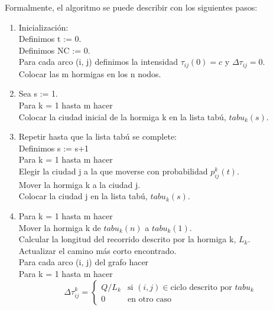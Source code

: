\documentclass{article}
\begin{document}
Formalmente, el algoritmo se puede describir con los siguientes pasos:
\begin{enumerate}
    \item Inicialización: \\
    \hspace*{0.25cm} Definimos t := 0. \\
    \hspace*{0.25cm} Definimos NC := 0. \\
    \hspace*{0.25cm} Para cada arco (i, j) definimos la intensidad $\tau_{ij}(0) = c$ y $\Delta \tau_{ij} = 0$. \\
    \hspace*{0.25cm} Colocar las m hormigas en los n nodos.
    \item Sea s := 1. \\
    Para k = 1 hasta m hacer \\
    \hspace*{0.25cm} Colocar la ciudad inicial de la hormiga k en la lista tabú, $tabu_k(s)$. 

    \item Repetir hasta que la lista tabú se complete: \\
    Definimos s := s+1 \\
    Para k = 1 hasta m hacer \\
    \hspace*{0.25cm} Elegir la ciudad j a la que moverse con probabilidad $p_{ij}^k(t)$. \\
    \hspace*{0.25cm} Mover la hormiga k a la ciudad j. \\
    \hspace*{0.25cm} Colocar la ciudad j en la lista tabú, $tabu_k(s)$. 
    
    \item Para k = 1 hasta m hacer \\
    \hspace*{0.25cm} Mover la hormiga k de $tabu_k(n)$ a $tabu_k(1)$. \\
    \hspace*{0.25cm} Calcular la longitud del recorrido descrito por la hormiga k, $L_k$. \\
    \hspace*{0.25cm} Actualizar el camino más corto encontrado. \\
    \hspace*{0.25cm} Para cada arco (i, j) del grafo hacer \\
    \hspace*{0.25cm} Para k = 1 hasta m hacer 
    \begin{equation*}
        \Delta \tau_{ij}^k = \begin{cases}
        Q / L_k & \text{si } (i, j) \in \text{ciclo descrito por } tabu_k \\
        0 & \text{en otro caso}
        \end{cases}
    \end{equation*}


\end{enumerate}
\end{document}
